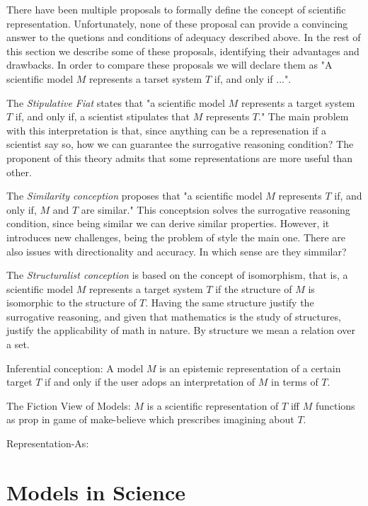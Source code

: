 There have been multiple proposals to formally define the concept of scientific representation. Unfortunately, none of these proposal can provide a convincing answer to the quetions and conditions of adequacy described above. In the rest of this section we describe some of these proposals, identifying their advantages and drawbacks. In order to compare these proposals we will declare them as "A scientific model $M$ represents a tarset system $T$ if, and only if ...".

The \emph{Stipulative Fiat} states that "a scientific model $M$ represents a target system $T$ if, and only if, a scientist stipulates that $M$ represents $T$." The main problem with this interpretation is that, since anything can be a represenation if a scientist say so, how we can guarantee the surrogative reasoning condition? The proponent of this theory admits that some representations are more useful than other.

The \emph{Similarity conception} proposes that "a scientific model $M$ represents $T$ if, and only if, $M$ and $T$ are similar." This conceptsion solves the surrogative reasoning condition, since being similar we can derive similar properties. However, it introduces new challenges, being the problem of style the main one. There are also issues with directionality and accuracy. In which sense are they simmilar?

The \emph{Structuralist conception} is based on the concept of isomorphism, that is, a scientific model $M$ represents a target system $T$ if the structure of $M$ is isomorphic to the structure of $T$. Having the same structure justify the surrogative reasoning, and given that mathematics is the study of structures, justify the applicability of math in nature. By structure we mean a relation over a set.

{\color{red} Inferential conception: A model $M$ is an epistemic representation of a certain target $T$ if and only if the user adops an interpretation of $M$ in terms of $T$.}

{\color{red} The Fiction View of Models: $M$ is a scientific representation of $T$ iff $M$ functions as prop in game of make-believe which prescribes imagining about $T$.}

{\color{red} Representation-As: }


\section{Models in Science}

